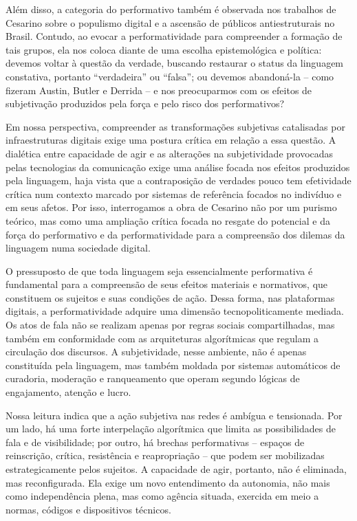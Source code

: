 \documentclass[portuguese]{textolivre}
\begin{document}
Além disso, a categoria do performativo também é observada nos trabalhos de Cesarino sobre o populismo digital e a ascensão de públicos antiestruturais no Brasil. Contudo, ao evocar a performatividade para compreender a formação de tais grupos, ela nos coloca diante de uma escolha epistemológica e política: devemos voltar à questão da verdade, buscando restaurar o status da linguagem constativa, portanto “verdadeira” ou “falsa”; ou devemos abandoná-la – como fizeram Austin, Butler e Derrida – e nos preocuparmos com os efeitos de subjetivação produzidos pela força e pelo risco dos performativos?

Em nossa perspectiva, compreender as transformações subjetivas catalisadas por infraestruturas digitais exige uma postura crítica em relação a essa questão. A dialética entre capacidade de agir e as alterações na subjetividade provocadas pelas tecnologias da comunicação exige uma análise focada nos efeitos produzidos pela linguagem, haja vista que a contraposição de verdades pouco tem efetividade crítica num contexto marcado por sistemas de referência focados no indivíduo e em seus afetos. Por isso, interrogamos a obra de Cesarino não por um purismo teórico, mas como uma ampliação crítica focada no resgate do potencial e da força do performativo e da performatividade para a compreensão dos dilemas da linguagem numa sociedade digital.

O pressuposto de que toda linguagem seja essencialmente performativa é fundamental para a compreensão de seus efeitos materiais e normativos, que constituem os sujeitos e suas condições de ação. Dessa forma, nas plataformas digitais, a performatividade adquire uma dimensão tecnopoliticamente mediada. Os atos de fala não se realizam apenas por regras sociais compartilhadas, mas também em conformidade com as arquiteturas algorítmicas que regulam a circulação dos discursos. A subjetividade, nesse ambiente, não é apenas constituída pela linguagem, mas também moldada por sistemas automáticos de curadoria, moderação e ranqueamento que operam segundo lógicas de engajamento, atenção e lucro.

Nossa leitura indica que a ação subjetiva nas redes é ambígua e tensionada. Por um lado, há uma forte interpelação algorítmica que limita as possibilidades de fala e de visibilidade; por outro, há brechas performativas – espaços de reinscrição, crítica, resistência e reapropriação – que podem ser mobilizadas estrategicamente pelos sujeitos. A capacidade de agir, portanto, não é eliminada, mas reconfigurada. Ela exige um novo entendimento da autonomia, não mais como independência plena, mas como agência situada, exercida em meio a normas, códigos e dispositivos técnicos.
\end{document}
